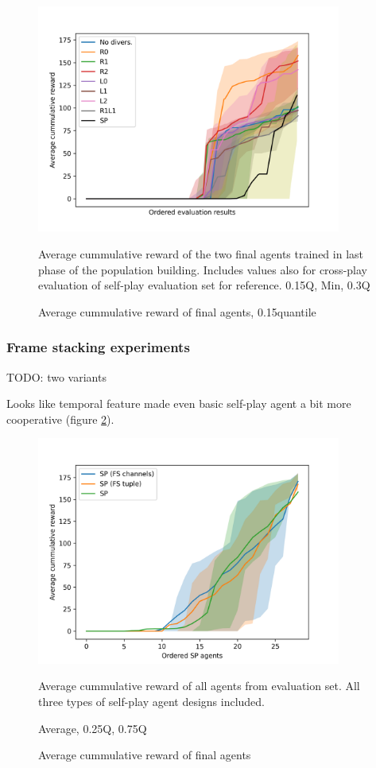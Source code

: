 \begin{figure}[!ht]
    \centering
    \includegraphics*[width=10cm]{../img/SimpleCNNOrderedAvg0.15Q.png}

    \caption{Average cummulative reward of final agents, 0.15quantile}
    \label{SimpleCNNOrderedAvg0.15Q}
    \medskip
    \small 
    Average cummulative reward of the two final agents trained in last phase of the population building.
    Includes values also for cross-play evaluation of self-play evaluation set for reference. 
    0.15Q, Min, 0.3Q

\end{figure}


\subsubsection{Frame stacking experiments}
TODO: two variants

Looks like temporal feature made even basic self-play agent a bit more cooperative (figure \ref{FSVariantsOrderedAvg}).

\begin{figure}[!ht]
    \centering
    \includegraphics*[width=10cm]{../img/FSVariantsOrderedAvg.png}

    \caption{Average cummulative reward of final agents}
    \label{FSVariantsOrderedAvg}
    \medskip
    \small 
    Average cummulative reward of all agents from evaluation set.
    All three types of self-play agent designs included.

    Average, 0.25Q, 0.75Q

\end{figure}

